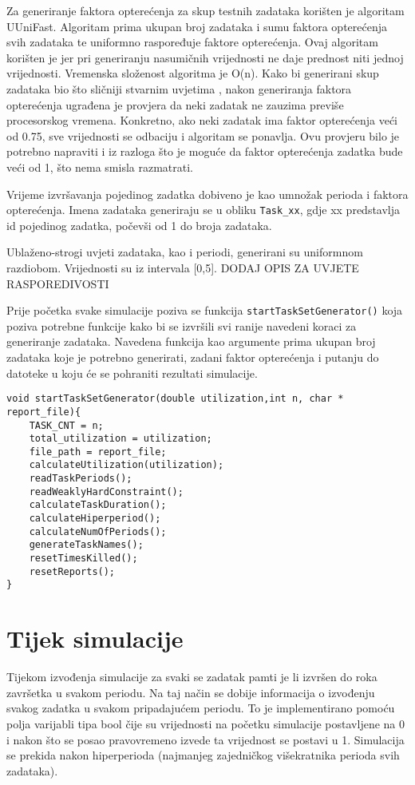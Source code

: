 \documentclass[../zavrsni.tex]{subfiles}
\begin{document}
Za generiranje faktora opterećenja za skup testnih zadataka korišten je algoritam UUniFast. Algoritam prima ukupan broj zadataka 
i sumu faktora opterećenja svih zadataka te uniformno raspoređuje faktore opterećenja. Ovaj algoritam korišten je jer pri generiranju nasumičnih
vrijednosti ne daje prednost niti jednoj vrijednosti. Vremenska složenost algoritma je O(n). Kako bi generirani skup zadataka bio što sličniji stvarnim uvjetima
, nakon generiranja faktora opterećenja ugrađena je provjera da neki zadatak ne zauzima previše procesorskog vremena. Konkretno, ako neki zadatak ima faktor
opterećenja veći od 0.75, sve vrijednosti se odbaciju i algoritam se ponavlja. Ovu provjeru bilo je potrebno napraviti i iz razloga što je moguće da faktor
opterećenja zadatka bude veći od 1, što nema smisla razmatrati.

Vrijeme izvršavanja pojedinog zadatka dobiveno je kao umnožak perioda i faktora opterećenja.
Imena zadataka generiraju se u obliku \texttt{Task\_xx}, gdje xx predstavlja id pojedinog zadatka, počevši od 1 do broja zadataka.

Ublaženo-strogi uvjeti zadataka, kao i periodi, generirani su uniformnom razdiobom. Vrijednosti su iz intervala [0,5]. DODAJ OPIS ZA UVJETE RASPOREDIVOSTI

Prije početka svake simulacije poziva se funkcija \texttt{startTaskSetGenerator()} koja poziva potrebne funkcije kako bi se izvršili 
svi ranije navedeni koraci za generiranje zadataka. Navedena funkcija kao argumente prima ukupan broj zadataka koje je potrebno generirati, zadani 
faktor opterećenja i putanju do datoteke u koju će se pohraniti rezultati simulacije.
\begin{lstlisting}[style=CStyle,caption={Funckija startTaskSetGenerator},captionpos=b]
void startTaskSetGenerator(double utilization,int n, char * report_file){
    TASK_CNT = n; 
    total_utilization = utilization; 
    file_path = report_file;
    calculateUtilization(utilization);
    readTaskPeriods();
    readWeaklyHardConstraint();
    calculateTaskDuration();
    calculateHiperperiod();
    calculateNumOfPeriods();
    generateTaskNames();
    resetTimesKilled();
    resetReports();
}
\end{lstlisting}
\section{Tijek simulacije}

Tijekom izvođenja simulacije za svaki se zadatak pamti je li izvršen do roka završetka u svakom periodu. 
Na taj način se dobije informacija o izvođenju svakog zadatka u svakom pripadajućem periodu. To je implementirano 
pomoću polja varijabli tipa bool čije su vrijednosti na početku simulacije postavljene na 0 i nakon što se posao pravovremeno izvede 
ta vrijednost se postavi u 1. Simulacija se prekida nakon hiperperioda (najmanjeg zajedničkog višekratnika perioda 
svih zadataka).
\end{document}

